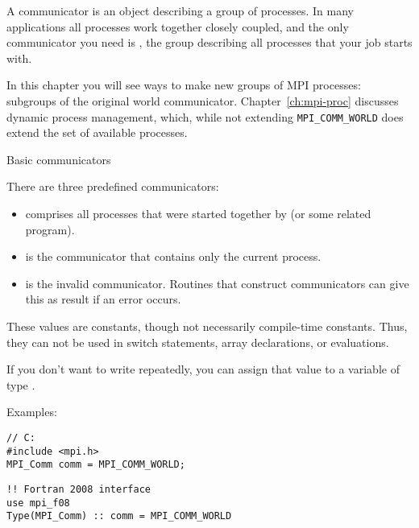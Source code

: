 
A communicator is an object describing a group of processes. In many 
applications all processes work together closely coupled, and the
only communicator you need is , the
group describing all processes that your job starts with.

In this chapter you will see ways to make new groups of MPI processes:
subgroups of the original world communicator.
Chapter~\ref{ch:mpi-proc} discusses dynamic process management, which, while
not extending \lstinline{MPI_COMM_WORLD} does extend the set of
available processes.

 {Basic communicators}
\label{sec:comm-basic}

There are three predefined communicators:
\begin{itemize}
\item {} comprises all processes that were started 
  together by  (or some related program).
\item {} is the communicator that contains only
   the current process.
\item {} is the invalid communicator. Routines
  that construct communicators can give this as result if an error occurs.
\end{itemize}
These values are constants, though not necessarily compile-time constants.
Thus, they can not be used in switch statements, array declarations,
or  evaluations.

If you don't want to write  repeatedly, you can
assign that value to a variable of type .

Examples:
\lstset{language=C}
\begin{lstlisting}
// C:
#include <mpi.h>
MPI_Comm comm = MPI_COMM_WORLD;
\end{lstlisting}

\lstset{language=Fortran}
\begin{lstlisting}
!! Fortran 2008 interface
use mpi_f08
Type(MPI_Comm) :: comm = MPI_COMM_WORLD
\end{lstlisting}

